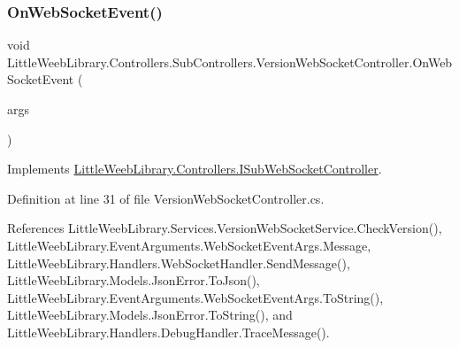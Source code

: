 \subsubsection{\texorpdfstring{On\+Web\+Socket\+Event()}{OnWebSocketEvent()}}
{\footnotesize\ttfamily void Little\+Weeb\+Library.\+Controllers.\+Sub\+Controllers.\+Version\+Web\+Socket\+Controller.\+On\+Web\+Socket\+Event (\begin{DoxyParamCaption}\item[{\mbox{\hyperlink{class_little_weeb_library_1_1_event_arguments_1_1_web_socket_event_args}{Web\+Socket\+Event\+Args}}}]{args }\end{DoxyParamCaption})}



Implements \mbox{\hyperlink{interface_little_weeb_library_1_1_controllers_1_1_i_sub_web_socket_controller_adcb26b7b397d6a67ccbf114008c29985}{Little\+Weeb\+Library.\+Controllers.\+I\+Sub\+Web\+Socket\+Controller}}.



Definition at line 31 of file Version\+Web\+Socket\+Controller.\+cs.



References Little\+Weeb\+Library.\+Services.\+Version\+Web\+Socket\+Service.\+Check\+Version(), Little\+Weeb\+Library.\+Event\+Arguments.\+Web\+Socket\+Event\+Args.\+Message, Little\+Weeb\+Library.\+Handlers.\+Web\+Socket\+Handler.\+Send\+Message(), Little\+Weeb\+Library.\+Models.\+Json\+Error.\+To\+Json(), Little\+Weeb\+Library.\+Event\+Arguments.\+Web\+Socket\+Event\+Args.\+To\+String(), Little\+Weeb\+Library.\+Models.\+Json\+Error.\+To\+String(), and Little\+Weeb\+Library.\+Handlers.\+Debug\+Handler.\+Trace\+Message().


